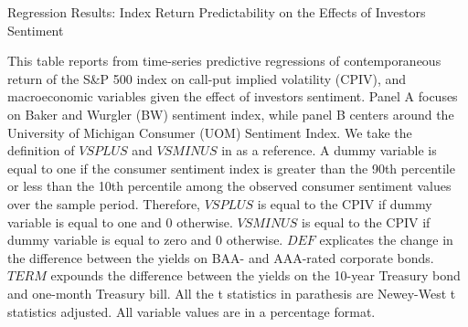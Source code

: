 \begin{table}[h]

\caption{Regression Results: Index Return Predictability on the Effects of Investors Sentiment}\label{table:sentiment}
\begin{threeparttable}

\medskip

{\scriptsize 
This table reports from time-series predictive regressions of contemporaneous return of the S\&P 500 index on call-put implied volatility (CPIV), and macroeconomic variables given the effect of investors sentiment. Panel A focuses on Baker and Wurgler (BW) sentiment index, while panel B centers around the University of Michigan Consumer (UOM) Sentiment Index. We take the definition of $VSPLUS$ and $VSMINUS$ in \textcite{atilgan2015implied} as a reference. A dummy variable is equal to one if the consumer sentiment index is greater than the 90th percentile or less than the 10th percentile among the observed consumer sentiment values over the sample period. Therefore, $VSPLUS$ is equal to the CPIV if dummy variable is equal to one and 0 otherwise. $VSMINUS$ is equal to the CPIV if dummy variable is equal to zero and 0 otherwise. $DEF$ explicates the change in the difference between the yields on BAA- and AAA-rated corporate bonds. $TERM$ expounds the difference between the yields on the 10-year Treasury bond and one-month Treasury bill. All the t statistics in parathesis are Newey-West t statistics adjusted. All variable values are in a percentage format.    
}
\medskip


\begin{subtable}[t]{\linewidth}


\end{subtable}
\end{threeparttable}
\end{table}

